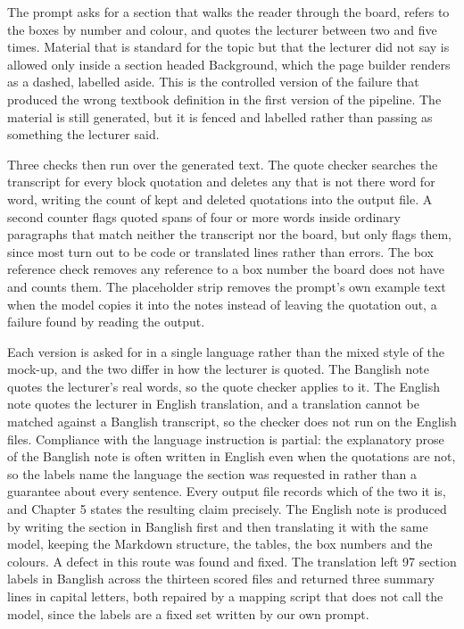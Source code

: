 The prompt asks for a section that walks the reader through the board, refers to the boxes
by number and colour, and quotes the lecturer between two and five times. Material that is
standard for the topic but that the lecturer did not say is allowed only inside a section
headed Background, which the page builder renders as a dashed, labelled aside. This
is the controlled version of the failure that produced the wrong textbook definition in
the first version of the pipeline. The material is still generated, but it is fenced and
labelled rather than passing as something the lecturer said.

Three checks then run over the generated text. The quote checker searches the transcript
for every block quotation and deletes any that is not there word for word, writing the
count of kept and deleted quotations into the output file. A second counter flags quoted
spans of four or more words inside ordinary paragraphs that match neither the transcript
nor the board, but only flags them, since most turn out to be code or translated lines
rather than errors. The box reference check removes any reference to a box number the
board does not have and counts them. The placeholder strip removes the prompt's own
example text when the model copies it into the notes instead of leaving the quotation out,
a failure found by reading the output.

Each version is asked for in a single language rather than the mixed style of the
mock-up, and the two differ in how the lecturer is quoted. The Banglish note quotes the
lecturer's real words, so the quote checker applies to it. The English note quotes the
lecturer in English translation, and a translation cannot be matched against a Banglish
transcript, so the checker does not run on the English files. Compliance with the
language instruction is partial: the explanatory prose of the Banglish note is often
written in English even when the quotations are not, so the labels name the language the
section was requested in rather than a guarantee about every sentence. Every output file records
which of the two it is, and Chapter 5 states the resulting claim precisely. The English
note is produced by writing the section in Banglish first and then translating it with the
same model, keeping the Markdown structure, the tables, the box numbers and the colours. A
defect in this route was found and fixed. The translation left 97 section labels in
Banglish across the thirteen scored files and returned three summary lines in capital
letters, both repaired by a mapping script that does not call the model, since the labels
are a fixed set written by our own prompt.

